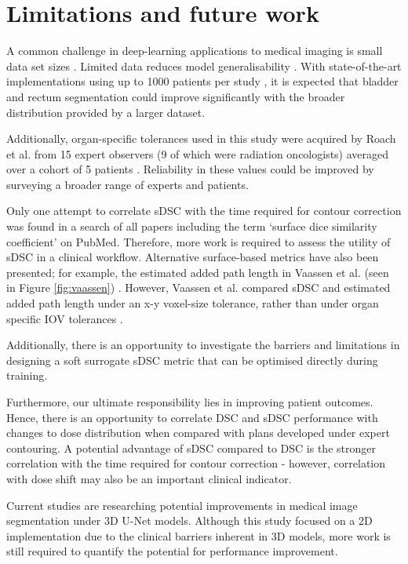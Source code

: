 \section{Limitations and future work}

A common challenge in deep-learning applications to medical imaging is small data set sizes \cite{Ronneberger_2015}. Limited data reduces model generalisability \cite{Shen2017}. With state-of-the-art implementations using up to 1000 patients per study \cite{Nikolov_2018}, it is expected that bladder and rectum segmentation could improve significantly with the broader distribution provided by a larger dataset.

Additionally, organ-specific tolerances used in this study were acquired by Roach et al. from 15 expert observers (9 of which were radiation oncologists) averaged over a cohort of 5 patients \cite{Roach_2019}. Reliability in these values could be improved by surveying a broader range of experts and patients.

Only one attempt to correlate sDSC with the time required for contour correction was found in a search of all papers including the term `surface dice similarity coefficient' on PubMed. Therefore, more work is required to assess the utility of sDSC in a clinical workflow. Alternative surface-based metrics have also been presented; for example, the estimated added path length in Vaassen et al. (seen in Figure \ref{fig:vaassen}) \cite{Vaassen_2020}. However, Vaassen et al. compared sDSC and estimated added path length under an x-y voxel-size tolerance, rather than under organ specific IOV tolerances \cite{Vaassen_2020}. 

Additionally, there is an opportunity to investigate the barriers and limitations in designing a soft surrogate sDSC metric that can be optimised directly during training.

Furthermore, our ultimate responsibility lies in improving patient outcomes. Hence, there is an opportunity to correlate DSC and sDSC performance with changes to dose distribution when compared with plans developed under expert contouring. A potential advantage of sDSC compared to DSC is the stronger correlation with the time required for contour correction - however, correlation with dose shift may also be an important clinical indicator.

Current studies are researching potential improvements in medical image segmentation under 3D U-Net models. Although this study focused on a 2D implementation due to the clinical barriers inherent in 3D models, more work is still required to quantify the potential for performance improvement. 

